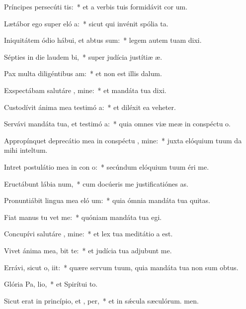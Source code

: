 \item Príncipes persecúti   tis:~* et a verbis tuis formidávit cor um.
\item Lætábor ego super eló a:~* sicut qui invénit spólia ta.
\item Iniquitátem ódio hábui, et abtus sum:~* legem autem tuam dixi.
\item Sépties in die laudem  bi,~* super judícia justítiæ æ.
\item Pax multa diligéntibus  am:~* et non est illis dalum.
\item Exspectábam salutáre , mine:~* et mandáta tua dixi.
\item Custodívit ánima mea testimó a:~* et diléxit ea veheter.
\item Servávi mandáta tua, et testimó a:~* quia omnes viæ meæ in conspéctu o.
\item Appropínquet deprecátio mea in conspéctu , mine:~* juxta elóquium tuum da mihi inteltum.
\item Intret postulátio mea in con o:~* secúndum elóquium tuum éri me.
\item Eructábunt lábia  num,~* cum docúeris me justificatiónes as.
\item Pronuntiábit lingua mea eló um:~* quia ómnia mandáta tua quitas.
\item Fiat manus tu  vet me:~* quóniam mandáta tua egi.
\item Concupívi salutáre , mine:~* et lex tua meditátio a est.
\item Vivet ánima mea,  bit te:~* et judícia tua adjubunt me.
\item Errávi, sicut o,  iit:~* quære servum tuum, quia mandáta tua non sum obtus.
\item Glória Pa,  lio,~* et Spirítui to.
\item Sicut erat in princípio, et ,  per,~* et in sǽcula sæculórum. men.
